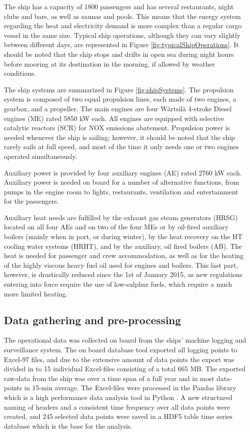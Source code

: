 \documentclass[preprint,12pt]{elsarticle}
\begin{document}
The ship has a capacity of 1800 passengers and has several restaurants, night clubs and bars, as well as saunas and pools. This means that the energy system regarding the heat and electricity demand is more complex than a regular cargo vessel in the same size. Typical ship operations, although they can vary slightly between different days, are represented in Figure \ref{fig:typicalShipOperations}. It should be noted that the ship stops and drifts in open sea during night hours before mooring at its destination in the morning, if allowed by weather conditions.

The ship systems are summarized in Figure \ref{fig:shipSystems}. The propulsion system is composed of two equal propulsion lines, each made of two engines, a gearbox, and a propeller. The main engines are four Wärtsilä 4-stroke Diesel engines (ME) rated 5850 kW each. All engines are equipped with selective catalytic reactors (SCR) for NOX emissions abatement. Propulsion power is needed whenever the ship is sailing; however, it should be noted that the ship rarely sails at full speed, and most of the time it only needs one or two engines operated simultaneously.

Auxiliary power is provided by four auxiliary engines (AE) rated 2760 kW each. Auxiliary power is needed on board for a number of alternative functions, from pumps in the engine room to lights, restaurants, ventilation and entertainment for the passengers. 

Auxiliary heat needs are fulfilled by the exhaust gas steam generators (HRSG) located on all four AEs and on two of the four MEs or by oil-fired auxiliary boilers (mainly when in port, or during winter), by the heat recovery on the HT cooling water systems (HRHT), and by the auxiliary, oil fired boilers (AB). The heat is needed for passenger and crew accommodation, as well as for the heating of the highly viscous heavy fuel oil used for engines and boilers. This last part, however, is drastically reduced since the 1st of January 2015, as new regulations entering into force require the use of low-sulphur fuels, which require a much more limited heating.

\subsection{Data gathering and pre-processing} \label{sec:met:gathering}

The operational data was collected on board from the ships' machine logging and surveillance system. The on board database tool exported all logging points to Excel-97 files, and due to the extensive amount of data points the export was divided in to 15 individual Excel-files consisting of a total 665 MB. The exported raw-data from the ship was over a time span of a full year and in most data-points in 15-min average. The Excel-files were processed in the Pandas library which is a high performance data analysis tool in Python \cite{mckinney-proc-scipy-2010}. A new structured naming of headers and a consistent time frequency over all data points were created, and 245 selected data points were saved in a HDF5 table time series database which is the base for the analysis.
\end{document}
